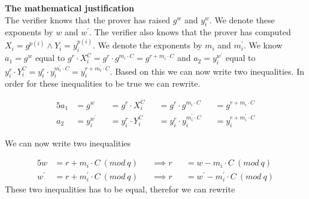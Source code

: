 \noindent
\textbf{The mathematical justification}\\
The verifier knows that the prover has raised \begin{math}g^w\end{math} and \begin{math}y_i^w\end{math}. We denote these exponents by \begin{math}w\end{math}    and \begin{math}w^{'}\end{math}. The verifier also knows that the prover has computed \begin{math}X_i=g^{p(i)}  \land Y_i=y_i^{p(i)} \end{math}. We denote the exponents by \begin{math}m_i\end{math} and \begin{math}m_i^{'}\end{math}. We know
\begin{math} a_1= g^w \end{math} equal to \begin{math}g^r  \cdot  X_i^C=g^r \cdot g^{m_i \cdot C} = g^{r+m_i \cdot C}\end{math} and
\begin{math} a_2= y_i^{w^{'}}\end{math} equal to \begin{math}y_i^r  \cdot  Y_i^C=y_i^r \cdot y_i^{m_i^{'} \cdot C} = y_i^{r+m_i^{'} \cdot C}\end{math}.
Based on this we can now write two inequalities. In order for these inequalities to be true we can rewrite.

\begin{alignat*}{5}
 a_1 &= g^w &&= g^r  \cdot  X_i^C &&=g^r \cdot g^{m_i \cdot C} &&= g^{r+m_i \cdot C}\\
 a_2 &= y_i^{w^{'}} &&= y_i^r  \cdot  Y_i^C &&=y_i^r \cdot y_i^{m_i^{'} \cdot C} &&= y_i^{r+m_i^{'} \cdot C}
\end{alignat*}

\noindent
We can now write two inequalities

\begin{alignat*}{5}
 w &= r+m_i  \cdot  C\ (mod\ q) &&\implies r &&= w-m_i \cdot C\ (mod\ q)\\
 w^{'} &= r+m_i^{'}  \cdot  C\ (mod\ q) &&\implies r &&= w^{'}-m_i^{'}  \cdot  C\ (mod\ q)
\end{alignat*}
\noindent
These two inequalities has to be equal, therefor we can rewrite

